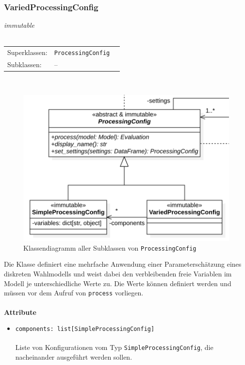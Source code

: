 \documentclass{article}
\begin{document}
\begin{itemize}
\subsubsection*{\large{\textbf{VariedProcessingConfig}\label{cls:VariedProcessingConfig}}}
\textit{\flqq{}immutable\frqq}\normalsize\\\\
\begin{tabular}{lll}
 Superklassen: & \texttt{ProcessingConfig}\\
 Subklassen: & --
\end{tabular}\\
\begin{figure}[H]%
    \centering
    \includegraphics[width=13cm]{entwurf/Entwurf_dokument/img/cls/model/ProcessingConfigs.png}
    \caption{Klassendiagramm aller Subklassen von \texttt{ProcessingConfig}}
\end{figure}

Die Klasse definiert eine mehrfache Anwendung einer Parameterschätzung eines diskreten Wahlmodells und weist dabei den verbleibenden freie Variablen im Modell je unterschiedliche Werte zu. Die Werte können definiert werden und müssen vor dem Aufruf von \texttt{process} vorliegen.
\\\\

\textbf{Attribute}
\begin{itemize}\setlength\itemsep{3em}
\item \texttt{components: list[SimpleProcessingConfig]}\\\\
Liste von Konfigurationen vom Typ \texttt{SimpleProcessingConfig}, die nacheinander ausgeführt werden sollen.
\\\\
\end{itemize}


\end{itemize}
\end{document}
